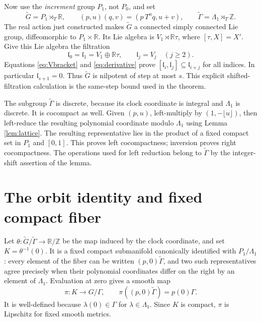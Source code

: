 \documentclass[11pt]{article}
\newcommand{\R}{\mathbb R}
\newcommand{\Z}{\mathbb Z}
\begin{document}
Now use the \emph{increment} group $P_1$, not $P_0$, and set
\begin{equation}\label{eq:semi}
 \widetilde G=P_1\rtimes_T\R,
 \qquad (p,u)(q,v)=(p\,T^u q,u+v),
 \qquad \widetilde\Gamma=\Lambda_1\rtimes_T\Z.
\end{equation}
The real action just constructed makes $\widetilde G$ a connected simply
connected Lie group, diffeomorphic to $P_1\times\R$.
Its Lie algebra is $V_1\rtimes\R\tau$, where $[\tau,X]=X'$.
Give this Lie algebra the filtration
\[
 \mathfrak l_0=\mathfrak l_1=V_1\oplus\R\tau,
 \qquad \mathfrak l_j=V_j\quad(j\geq2).
\]
Equations \eqref{eq:Vbracket} and \eqref{eq:derivative} prove
$[\mathfrak l_i,\mathfrak l_j]\subseteq\mathfrak l_{i+j}$ for all indices.
In particular $\mathfrak l_{s+1}=0$. Thus $\widetilde G$ is nilpotent of
step at most $s$. This explicit shifted-filtration calculation is the
same-step bound used in the theorem.

The subgroup $\widetilde\Gamma$ is discrete, because its clock coordinate
is integral and $\Lambda_1$ is discrete. It is cocompact as well.
Given $(p,u)$, left-multiply by $(1,-\lfloor u\rfloor)$, then left-reduce
the resulting polynomial coordinate modulo $\Lambda_1$ using Lemma
\ref{lem:lattice}. The resulting representative lies in the product of a
fixed compact set in $P_1$ and $[0,1]$. This proves left cocompactness;
inversion proves right cocompactness. The operations used for left reduction
belong to $\widetilde\Gamma$ by the integer-shift assertion of the lemma.

\section{The orbit identity and fixed compact fiber}

Let $\theta:\widetilde G/\widetilde\Gamma\longrightarrow\R/\Z$ be the
map induced by the clock coordinate, and set $K=\theta^{-1}(0)$.
It is a fixed compact submanifold canonically identified with
$P_1/\Lambda_1$: every element of the fiber can be written
$(p,0)\widetilde\Gamma$, and two such representatives agree precisely when
their polynomial coordinates differ on the right by an element of
$\Lambda_1$.
Evaluation at zero gives a smooth map
\begin{equation}\label{eq:pi}
 \pi:K\longrightarrow G/\Gamma,\qquad
 \pi((p,0)\widetilde\Gamma)=p(0)\Gamma.
\end{equation}
It is well-defined because $\lambda(0)\in\Gamma$ for
$\lambda\in\Lambda_1$. Since $K$ is compact, $\pi$ is Lipschitz for
fixed smooth metrics.
\end{document}
